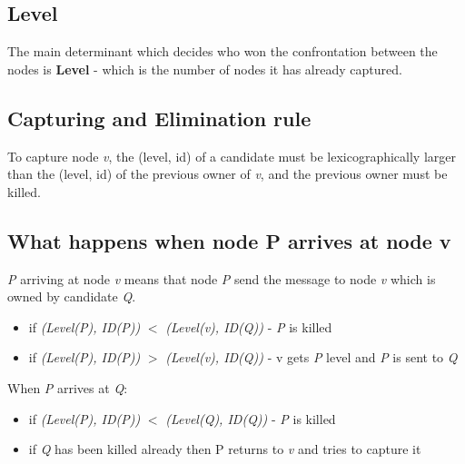 \documentclass{article}
\begin{document}
\subsection*{Level}
The main determinant which decides who won the confrontation between the nodes is \textbf{Level} - which is the number of nodes it has already captured.

\subsection*{Capturing and Elimination rule} 
To capture node \textit{v}, the (level, id) of a candidate must be lexicographically larger than the (level, id) of the previous owner of \textit{v}, and the previous owner must be killed.

\subsection*{What happens when node P arrives at node v}
\textit{P} arriving at node \textit{v} means that node \textit{P} send the message to node \textit{v} which is owned by candidate \textit{Q}.
\begin{itemize}
    \item if \textit{(Level(P), ID(P))} \(<\) \textit{(Level(v), ID(Q))} - \textit{P} is killed
    \item if \textit{(Level(P), ID(P))} \(>\) \textit{(Level(v), ID(Q))} - v gets \textit{P} level and \textit{P} is sent to \textit{Q}
\end{itemize}
When \textit{P} arrives at \textit{Q}:
\begin{itemize}
    \item if \textit{(Level(P), ID(P))} \(<\) \textit{(Level(Q), ID(Q))} - \textit{P} is killed
    \item if \textit{Q} has been killed already then P returns to \textit{v} and tries to capture it
\end{itemize}
\end{document}
